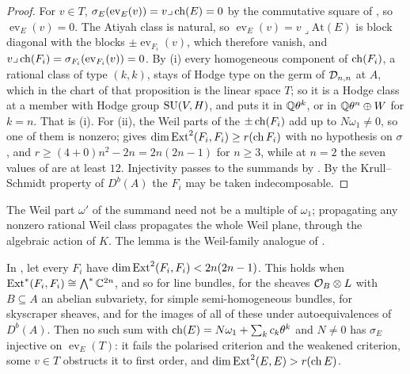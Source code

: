 \begin{proof}
For $v\in T$, $\sigma_{E}(\operatorname{ev}_{E}(v))=v\lrcorner\operatorname{ch}(E)=0$ by the
commutative square of , so $\operatorname{ev}_{E}(v)=0$.
The Atiyah class is natural, so $\operatorname{ev}_{E}(v)=v\lrcorner
\mathrm{At}(E)$ is block diagonal with the blocks $\pm\operatorname{ev}_{F_{i}}(v)$,
which therefore vanish, and $v\lrcorner\operatorname{ch}(F_{i})=\sigma_{F_{i}}
(\operatorname{ev}_{F_{i}}(v))=0$. By (i) every
homogeneous component of $\operatorname{ch}(F_{i})$, a rational class of type $(k,k)$, stays
of Hodge type on the germ of $\mathcal{D}_{n,n}$ at $A$, which in the chart of that
proposition is the linear space $T$; so it is a Hodge class at a member with
Hodge group $\operatorname{SU}(V,H)$, and \cite[Theorem~4.14]{paperI} puts it in $\mathbb{Q}\theta^{k}$, or
in $\mathbb{Q}\theta^{n}\oplus W$ for $k=n$. That is (i). For (ii), the Weil parts
of the $\pm\operatorname{ch}(F_{i})$ add up to $N\omega_{1}\ne0$, so one of them is nonzero;
 gives $\dim\operatorname{Ext}^{2}(F_{i},F_{i})\ge r(\operatorname{ch} F_{i})$ with
no hypothesis on $\sigma$, and $r\ge(4+0)n^{2}-2n=2n(2n-1)$ for $n\ge3$, while
at $n=2$ the seven values of  are at least $12$. Injectivity
passes to the summands by \cite[Lemma~3.38]{paperIII}. By the Krull--Schmidt property
of $D^{b}(A)$ the $F_{i}$ may be taken indecomposable.
\end{proof}

The Weil part $\omega'$ of the summand need not be a multiple of $\omega_{1}$;
propagating any nonzero rational Weil class propagates the whole Weil plane,
through the algebraic action of $K$. The lemma is the Weil-family analogue of
\cite[Corollary~3.41(ii)]{paperIII}.

\begin{corollary}
\label{cor:naturalsums}
In , let every $F_{i}$ have
$\dim\operatorname{Ext}^{2}(F_{i},F_{i})<2n(2n-1)$. This holds when
$\operatorname{Ext}^{*}(F_{i},F_{i})\cong\bigwedge^{*}\mathbb{C}^{2n}$, and so for line bundles, for
the sheaves $\mathcal{O}_{B}\otimes L$ with $B\subseteq A$ an abelian subvariety, for
simple semi-homogeneous bundles, for skyscraper sheaves, and for the images of
all of these under autoequivalences of $D^{b}(A)$. Then no such sum with
$\operatorname{ch}(E)=N\omega_{1}+\sum_{k}c_{k}\theta^{k}$ and $N\ne0$ has $\sigma_{E}$
injective on $\operatorname{ev}_{E}(T)$: it fails the polarised criterion and
the weakened criterion, some $v\in T$ obstructs it to first order, and
$\dim\operatorname{Ext}^{2}(E,E)>r(\operatorname{ch} E)$.
\end{corollary}

